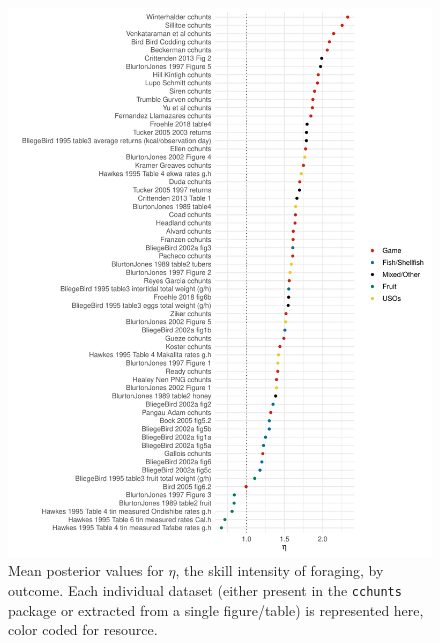\begin{figure}[h]
\centering
\includegraphics[width=12cm] {text/images/supplementary/eta_outcome.pdf}
\renewcommand{\thefigure}{S\arabic{figure}}
\caption{Mean posterior values for $\eta$, the skill intensity of foraging, by outcome. Each individual dataset (either present in the \texttt{cchunts} package or extracted from a single figure/table) is represented here, color coded for resource. }
\label{fig:eta_outcome}
\end{figure}

